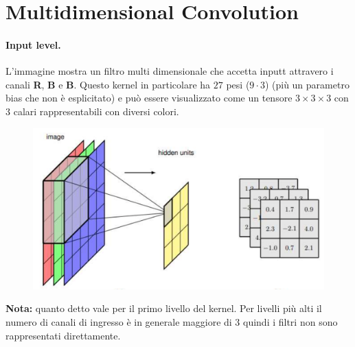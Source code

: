 \section{Multidimensional Convolution}
\paragraph{Input level.}
L'immagine mostra un filtro multi dimensionale che accetta inputt attravero i canali \textbf{R}, \textbf{B} e \textbf{B}. Questo kernel in particolare ha $27$ pesi ($9\cdot 3$) (più un parametro bias che non è esplicitato) e può essere visualizzato come un tensore $3\times3\times3$ con $3$ calari rappresentabili con diversi colori.
\begin{figure}[!h]
    \includegraphics[scale=.35]{images/cnn/multid_conv.png}
    \centering
\end{figure}



\textbf{Nota:} quanto detto vale per il primo livello del kernel. Per livelli più alti il numero di canali di ingresso è in generale maggiore di 3 quindi i filtri non sono rappresentati direttamente.


